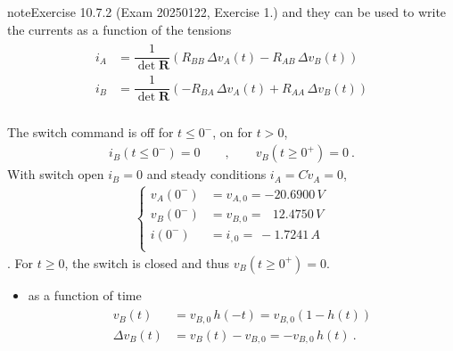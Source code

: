\documentclass[letterpaper,10pt,italian]{jupyterBook}
\begin{document}
\begin{sphinxadmonition}{note}{Exercise 10.7.2 (Exam 2025\sphinxhyphen{}01\sphinxhyphen{}22, Exercise 1.)}
\sphinxAtStartPar
and they can be used to write the currents as a function of the tensions
\begin{equation*}
\begin{split}\begin{aligned}
  i_A & = \dfrac{1}{\det \mathbf{R}} \left( R_{BB} \, \Delta v_A(t) - R_{AB} \, \Delta v_B(t) \right) \\
  i_B & = \dfrac{1}{\det \mathbf{R}} \left(-R_{BA} \, \Delta v_A(t) + R_{AA} \, \Delta v_B(t) \right) \\
\end{aligned}\end{split}
\end{equation*}


\sphinxAtStartPar
The switch command is off for \(t \le 0^-\), on for \(t > 0\),
\begin{equation*}
\begin{split}i_B(t \le 0^{-}) = 0 \qquad , \qquad v_B (t \ge 0^+) = 0 \ .\end{split}
\end{equation*}
\sphinxAtStartPar
{} With switch open \(i_B = 0\) and steady conditions \(i_A = C \dot{v}_A = 0\),
\begin{equation*}
\begin{split}\begin{cases}
  v_A(0^-) & = v_{A,0} =     - 20.6900 \, V \\
  v_B(0^-) & = v_{B,0} = \ \ \ 12.4750 \, V \\
    i(0^-) & = i_{ ,0} = \    - 1.7241 \, A \\
\end{cases}\end{split}
\end{equation*}
\sphinxAtStartPar
{}. For \(t \ge 0\), the switch is closed and thus \(v_B(t\ge 0^+) = 0\).
\begin{itemize}
\item {} 
\sphinxAtStartPar
{} as a function of time
\begin{equation*}
\begin{split}\begin{aligned}
     v_{B}(t) & = v_{B,0} \, h(-t) = v_{B,0} ( 1 - h(t) ) \\
     \Delta v_B(t) & = v_{B}(t) - v_{B,0} = - v_{B,0} \,  h(t) \ . 
   \end{aligned}\end{split}

\end{equation*}
\end{itemize}
\end{sphinxadmonition}
\end{document}
